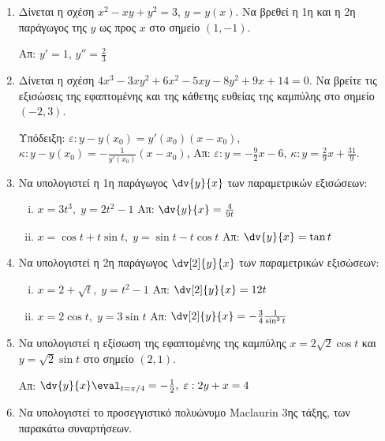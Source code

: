 \documentclass[a4paper,table]{report}
\begin{document}
\begin{enumerate}
  \item Δίνεται η σχέση $ x^{2} - xy + y^{2} = 3 $, $ y=y(x) $. Να βρεθεί η 1η
    και η 2η παράγωγος της $y$ ως προς $x$ στο σημείο $ (1,-1) $.

    \hfill Απ: $ y' = 1$, $ y'' = \frac{2}{3} $

  \item Δίνεται η σχέση $ 4x^{3} - 3xy^{2} + 6x^{2} - 5xy - 8 y^{2} + 9x + 14
    = 0$. Να βρείτε τις εξισώσεις της εφαπτομένης και της κάθετης ευθείας
    της καμπύλης στο σημείο $ (-2,3) $.

    \textcolor{Col1}{Υπόδειξη:} 
    $ \varepsilon: y-y(x_{0}) = y'(x_{0})(x- x_{0}) $, \;
    $ \kappa: y-y(x_{0}) = -\frac{1}{y'(x_{0})}(x- x_{0}) $, \;
    \hfill Απ: $\varepsilon\colon y = -\frac{9}{2} x - 6 $, 
    $\kappa\colon y = \frac{2}{9} x + \frac{31}{9} $.

  \item Να υπολογιστεί η 1η παράγωγος $ \dv{y}{x} $ των παραμετρικών εξισώσεων:
    \begin{enumerate}[i)]
      \item $ x = 3t^{3}, \; y=2t^{2}-1 $ \hfill Απ: $ \dv{y}{x} = \frac{4}{9t} $ 
      \item $ x = \cos{t} + t \sin{t}, \; y= \sin{t} - t \cos{t} $ 
        \hfill Απ: $ \dv{y}{x} = \tan{t} $ 
    \end{enumerate}

  \item Να υπολογιστεί η 2η παράγωγος $ \dv[2]{y}{x}$ των παραμετρικών εξισώσεων:
    \begin{enumerate}[i)]
      \item $ x=2 + \sqrt{t}, \; y=t^{2}-1 $ \hfill Απ: $ \dv[2]{y}{x} = 12 t $ 
      \item $ x=2 \cos{t}, \; y= 3 \sin{t}  $ \hfill Απ: $ \dv[2]{y}{x} = -
        \frac{3}{4} \frac{1}{\sin^{3}{t}} $  
    \end{enumerate}

  \item Να υπολογιστεί η εξίσωση της εφαπτομένης της καμπύλης 
    $ x=2 \sqrt{2} \cos{t} $ και $ y= \sqrt{2} \sin{t} $ στο σημείο $ (2,1) $.

    \hfill Απ: $ \dv{y}{x} \eval_{t= \pi /4} = - \frac{1}{2}, \; \varepsilon: 2y+x=4 $ 

  \item Να υπολογιστεί το προσεγγιστικό πολυώνυμο Maclaurin 3ης τάξης, των 
    παρακάτω συναρτήσεων.


\end{enumerate}
\end{document}
